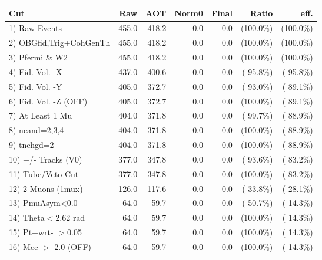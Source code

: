  \begin{table}[h!]\centering
 \begin{tabular}{||l||r|r|r|r|r|r||}
 \hline
 \hline
 Cut & Raw & AOT & Norm0 & Final & Ratio & eff.       \\
 \hline
  1) Raw Events           &        455.0 &        418.2 &          0.0 &          0.0 & (100.0\%) & (100.0\%) \\
  2) OBGfid,Trig+CohGenTh &        455.0 &        418.2 &          0.0 &          0.0 & (100.0\%) & (100.0\%) \\
  3) Pfermi \& W2         &        455.0 &        418.2 &          0.0 &          0.0 & (100.0\%) & (100.0\%) \\
  4) Fid. Vol. -X         &        437.0 &        400.6 &          0.0 &          0.0 & ( 95.8\%) & ( 95.8\%) \\
  5) Fid. Vol. -Y         &        405.0 &        372.7 &          0.0 &          0.0 & ( 93.0\%) & ( 89.1\%) \\
  6) Fid. Vol. -Z (OFF)   &        405.0 &        372.7 &          0.0 &          0.0 & (100.0\%) & ( 89.1\%) \\
  7) At Least 1 Mu        &        404.0 &        371.8 &          0.0 &          0.0 & ( 99.7\%) & ( 88.9\%) \\
  8) ncand=2,3,4          &        404.0 &        371.8 &          0.0 &          0.0 & (100.0\%) & ( 88.9\%) \\
  9) tnchgd=2             &        404.0 &        371.8 &          0.0 &          0.0 & (100.0\%) & ( 88.9\%) \\
 10) +/- Tracks (V0)      &        377.0 &        347.8 &          0.0 &          0.0 & ( 93.6\%) & ( 83.2\%) \\
 11) Tube/Veto Cut        &        377.0 &        347.8 &          0.0 &          0.0 & (100.0\%) & ( 83.2\%) \\
 12) 2 Muons (1mux)       &        126.0 &        117.6 &          0.0 &          0.0 & ( 33.8\%) & ( 28.1\%) \\
 13) PmuAsym<0.0          &         64.0 &         59.7 &          0.0 &          0.0 & ( 50.7\%) & ( 14.3\%) \\
 14) Theta$<$2.62 rad     &         64.0 &         59.7 &          0.0 &          0.0 & (100.0\%) & ( 14.3\%) \\
 15) Pt+wrt- $>$0.05      &         64.0 &         59.7 &          0.0 &          0.0 & (100.0\%) & ( 14.3\%) \\
 16) Mee $>$ 2.0  (OFF)   &         64.0 &         59.7 &          0.0 &          0.0 & (100.0\%) & ( 14.3\%) \\

\end{tabular}
\end{table}
